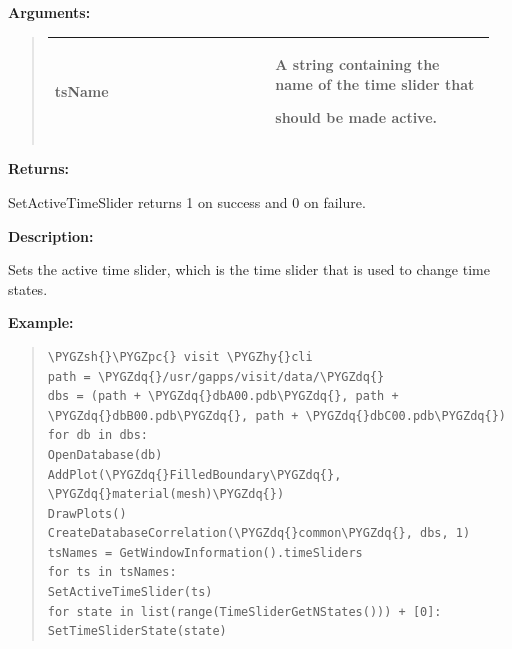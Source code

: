 \documentclass[letterpaper,10pt,english]{sphinxmanual}
\def\PYGZsh{\char`\#}
\def\PYGZpc{\char`\%}
\def\PYGZhy{\char`\-}
\def\PYGZdq{\char`\"}
\begin{document}
\begin{DUlineblock}{0em}
\item[] 
\item[] \textbf{Arguments:}
\end{DUlineblock}
\begin{quote}

\begin{tabular}{|p{0.475\linewidth}|p{0.475\linewidth}|}
\hline

tsName
 & 
\begin{DUlineblock}{0em}
\item[] A string containing the name of the time slider that
\item[] should be made active.
\end{DUlineblock}
\\
\hline\end{tabular}

\end{quote}

\begin{DUlineblock}{0em}
\item[] 
\item[] \textbf{Returns:}
\item[] SetActiveTimeSlider returns 1 on success and 0 on failure.
\item[] 
\item[] \textbf{Description:}
\item[] Sets the active time slider, which is the time slider that is used to
change time states.
\end{DUlineblock}

\begin{DUlineblock}{0em}
\item[] 
\end{DUlineblock}

\begin{DUlineblock}{0em}
\item[] \textbf{Example:}
\item[] 
\end{DUlineblock}
\begin{quote}

\begin{Verbatim}[commandchars=\\\{\}]
\PYGZsh{}\PYGZpc{} visit \PYGZhy{}cli
path = \PYGZdq{}/usr/gapps/visit/data/\PYGZdq{}
dbs = (path + \PYGZdq{}dbA00.pdb\PYGZdq{}, path + \PYGZdq{}dbB00.pdb\PYGZdq{}, path + \PYGZdq{}dbC00.pdb\PYGZdq{})
for db in dbs:
OpenDatabase(db)
AddPlot(\PYGZdq{}FilledBoundary\PYGZdq{}, \PYGZdq{}material(mesh)\PYGZdq{})
DrawPlots()
CreateDatabaseCorrelation(\PYGZdq{}common\PYGZdq{}, dbs, 1)
tsNames = GetWindowInformation().timeSliders
for ts in tsNames:
SetActiveTimeSlider(ts)
for state in list(range(TimeSliderGetNStates())) + [0]:
SetTimeSliderState(state)
\end{Verbatim}
\end{quote}
\end{document}
